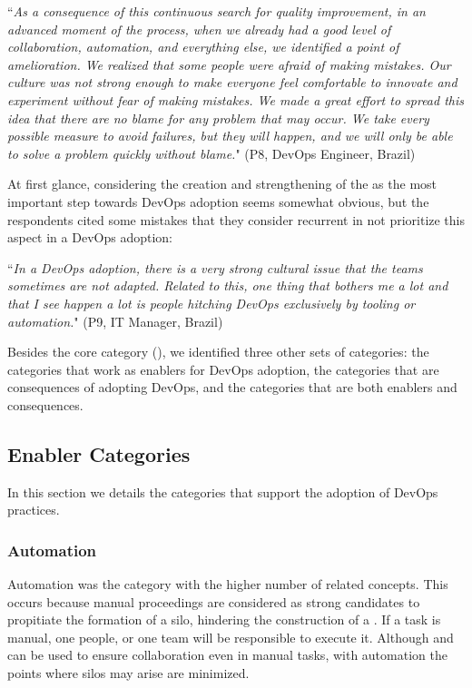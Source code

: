 \begin{mq}
``\emph{As a consequence of this continuous search for quality improvement, in an
advanced moment of the process, when we already had a good level of
collaboration, automation, and everything else, we identified a point of
amelioration. We realized that some people were afraid of making mistakes. Our
culture was not strong enough to make everyone feel comfortable to innovate and
experiment without fear of making mistakes. We made a great effort to spread
this idea that there are no blame for any problem that may occur. We take every possible
measure to avoid failures, but they
will happen, and we will only be able to solve a problem quickly without blame.}" (P8,
DevOps Engineer, Brazil)
\end{mq}

At first glance, considering the creation and strengthening of the  as the most important step towards DevOps adoption seems somewhat obvious, but
the respondents cited some mistakes that they consider recurrent in not
prioritize this aspect in a DevOps adoption:

\begin{mq}``\emph{In a DevOps adoption, there is a very strong cultural issue that the teams
sometimes are not adapted. Related to this, one thing that bothers me a lot and
that I see happen a lot is people hitching DevOps exclusively by tooling or
automation.}" (P9, IT Manager, Brazil)
\end{mq}

Besides the core category (), we identified
three other sets of categories: the categories that work as enablers
for DevOps adoption, the categories that are consequences of adopting
DevOps, and the categories that are both enablers and consequences.

\subsection{Enabler Categories}

In this section we details the categories that support the adoption of
DevOps practices. 
\subsubsection*{Automation} \label{ssec:automation}

Automation was the category with the higher number of related concepts. This
occurs because manual proceedings are considered as strong candidates to
propitiate the formation of a silo, hindering the construction
of a . If a task is manual, one people, or one
team will be responsible to execute it. Although  and  can
be used to ensure collaboration even in manual tasks, with automation the
points where silos may arise are minimized.

